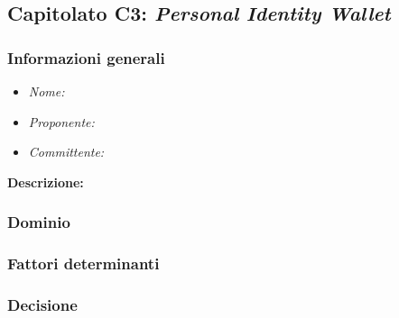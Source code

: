 \subsection{Capitolato C3: \textit{Personal Identity Wallet}}
\subsubsection{Informazioni generali}
\begin{itemize}
    \item \textit{Nome:}
    \item \textit{Proponente:}
    \item \textit{Committente:}
\end{itemize}
\textbf{Descrizione:}
\subsubsection{Dominio}
\subsubsection{Fattori determinanti}
\subsubsection{Decisione}
